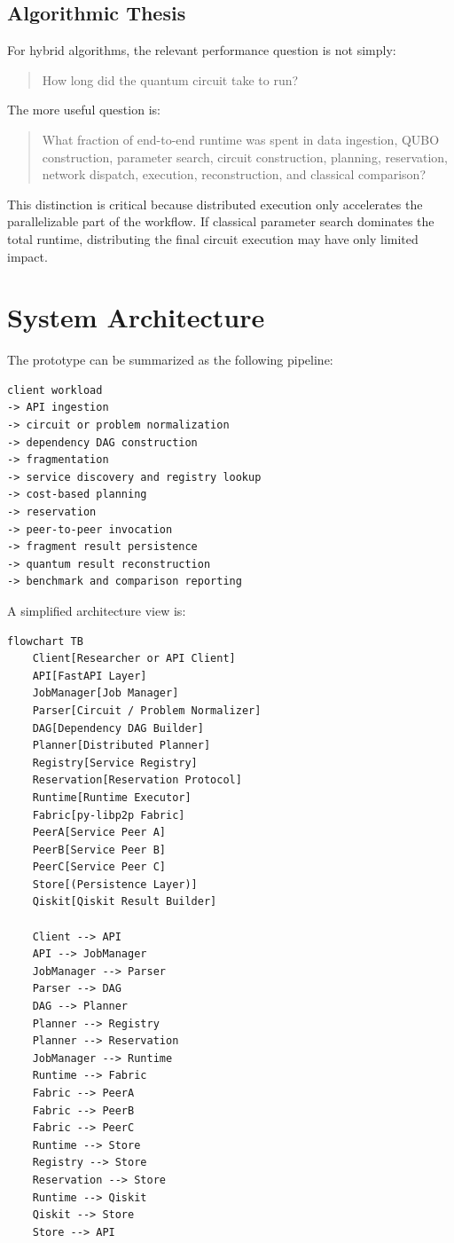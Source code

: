 \documentclass[11pt]{article}
\begin{document}
\subsection{Algorithmic Thesis}

For hybrid algorithms, the relevant performance question is not simply:

\begin{quote}
How long did the quantum circuit take to run?
\end{quote}

The more useful question is:

\begin{quote}
What fraction of end-to-end runtime was spent in data ingestion, QUBO construction, parameter search, circuit construction, planning, reservation, network dispatch, execution, reconstruction, and classical comparison?
\end{quote}

This distinction is critical because distributed execution only accelerates the parallelizable part of the workflow. If classical parameter search dominates the total runtime, distributing the final circuit execution may have only limited impact.

\section{System Architecture}

The prototype can be summarized as the following pipeline:

\begin{lstlisting}[style=codestyle,caption={Workflow sketch.}]
client workload
-> API ingestion
-> circuit or problem normalization
-> dependency DAG construction
-> fragmentation
-> service discovery and registry lookup
-> cost-based planning
-> reservation
-> peer-to-peer invocation
-> fragment result persistence
-> quantum result reconstruction
-> benchmark and comparison reporting
\end{lstlisting}

A simplified architecture view is:

\begin{lstlisting}[style=codestyle,caption={Architecture diagram source (Mermaid).}]
flowchart TB
    Client[Researcher or API Client]
    API[FastAPI Layer]
    JobManager[Job Manager]
    Parser[Circuit / Problem Normalizer]
    DAG[Dependency DAG Builder]
    Planner[Distributed Planner]
    Registry[Service Registry]
    Reservation[Reservation Protocol]
    Runtime[Runtime Executor]
    Fabric[py-libp2p Fabric]
    PeerA[Service Peer A]
    PeerB[Service Peer B]
    PeerC[Service Peer C]
    Store[(Persistence Layer)]
    Qiskit[Qiskit Result Builder]

    Client --> API
    API --> JobManager
    JobManager --> Parser
    Parser --> DAG
    DAG --> Planner
    Planner --> Registry
    Planner --> Reservation
    JobManager --> Runtime
    Runtime --> Fabric
    Fabric --> PeerA
    Fabric --> PeerB
    Fabric --> PeerC
    Runtime --> Store
    Registry --> Store
    Reservation --> Store
    Runtime --> Qiskit
    Qiskit --> Store
    Store --> API
\end{lstlisting}
\end{document}
